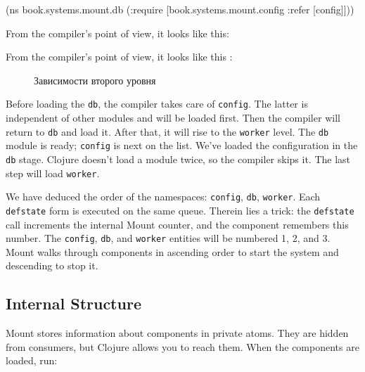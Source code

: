 \else

\begin{english}
  \begin{clojure}
(ns book.systems.mount.db
  (:require
   [book.systems.mount.config :refer [config]]))
  \end{clojure}
\end{english}

\fi

\ifprint

\noindent
From the compiler's point of view, it looks like this:

\begin{figure}[h!]
\end{figure}

\fi

\ifebook

\noindent
From the compiler's point of view, it looks like this :

\begin{figure}[b!]
  \caption{Зависимости второго уровня}
  \label{fig:chart-sys-3}
\end{figure}

\fi

Before loading the \verb|db|, the compiler takes care of \verb|config|. The latter is independent of other modules and will be loaded first. Then the compiler will return to \verb|db| and load it. After that, it will rise to the \verb|worker| level. The \verb|db| module is ready; \verb|config| is next on the list. We've loaded the configuration in the \verb|db| stage. Clojure doesn't load a module twice, so the compiler skips it. The last step will load \verb|worker|.


We have deduced the order of the namespaces: \verb|config|, \verb|db|, \verb|worker|. Each \verb|defstate| form is executed on the same queue. Therein lies a trick: the \verb|defstate| call increments the internal Mount counter, and the component remembers this number. The \verb|config|, \verb|db|, and \verb|worker| entities will be numbered 1, 2, and 3. Mount walks through components in ascending order to start the system and descending to stop it.

\subsection{Internal Structure}

Mount stores information about components in private atoms. They are hidden from consumers, but Clojure allows you to reach them. When the components are loaded, run:

